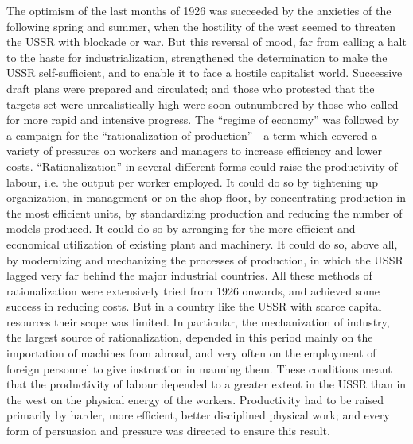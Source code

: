 The optimism of the last months of 1926 was succeeded by the anxieties of the following spring and summer, when the hostility of the west seemed to threaten the USSR with blockade or war. But this reversal of mood, far from calling a halt to the haste for industrialization, strengthened the determination to make the USSR self-sufficient, and to enable it to face a hostile capitalist world. Successive draft plans were prepared and circulated; and those who protested that the targets set were unrealistically high were soon outnumbered by those who called for more rapid and intensive progress. The ``regime of economy'' was followed by a campaign for the ``rationalization of production''---a term which covered a variety of pressures on workers and managers to increase efficiency and lower costs. ``Rationalization'' in several different forms could raise the productivity of labour, i.e. the output per worker employed. It could do so by tightening up organization, in management or on the shop-floor, by concentrating production in the most efficient units, by standardizing production and reducing the number of models produced. It could do so by arranging for the more efficient and economical utilization of existing plant and machinery. It could do so, above all, by modernizing and mechanizing the processes of production, in which the USSR lagged very far behind the major industrial countries. All these methods of rationalization were extensively tried from 1926 onwards, and achieved some success in reducing costs. But in a country like the USSR with scarce capital resources their scope was limited. In particular, the mechanization of industry, the largest source of rationalization, depended in this period mainly on the importation of machines from abroad, and very often on the employment of foreign personnel to give instruction in manning them. These conditions meant that the productivity of labour depended to a greater extent in the USSR than in the west on the physical energy of the workers. Productivity had to be raised primarily by harder, more efficient, better disciplined physical work; and every form of persuasion and pressure was directed to ensure this result. 

